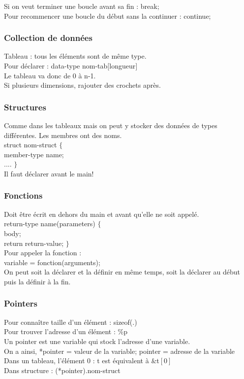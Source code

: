 \documentclass[../main.tex]{subfiles}
\begin{document}
Si on veut terminer une boucle avant sa fin : break;\\
Pour recommencer une boucle du début sans la continuer : continue;\\

\subsubsection{Collection de données}
Tableau : tous les éléments sont de même type. \\
Pour déclarer : data-type nom-tab$[$longueur$]$\\
Le tableau va donc de 0 à n-1.\\
Si plusieurs dimensions, rajouter des crochets après. \\

\subsubsection{Structures}
Comme dans les tableaux mais on peut y stocker des données de types différentes. Les membres ont des noms.\\
struct nom-struct $\{$\\
member-type name;\\
.... $\}$\\
Il faut déclarer avant le main!\\

\subsubsection{Fonctions}
Doit être écrit en dehors du main et avant qu'elle ne soit appelé.\\
return-type name(parameters) $\{$\\
body;\\
return return-value; $\}$\\

Pour appeler la fonction :\\
variable = fonction(arguments);\\
On peut soit la déclarer et la définir en même temps, soit la déclarer au début puis la définir à la fin.\\

\subsubsection{Pointers}
Pour connaître taille d'un élément : sizeof(.)\\
Pour trouver l'adresse d'un élément : \%p\\
Un pointer est une variable qui stock l'adresse d'une variable.\\
On a ainsi, *pointer = valeur de la variable; pointer = adresse de la variable\\
Dans un tableau, l'élément 0 : t est équivalent à $\&$t$[0]$\\
Dans structure : (*pointer).nom-struct\\
\end{document}
